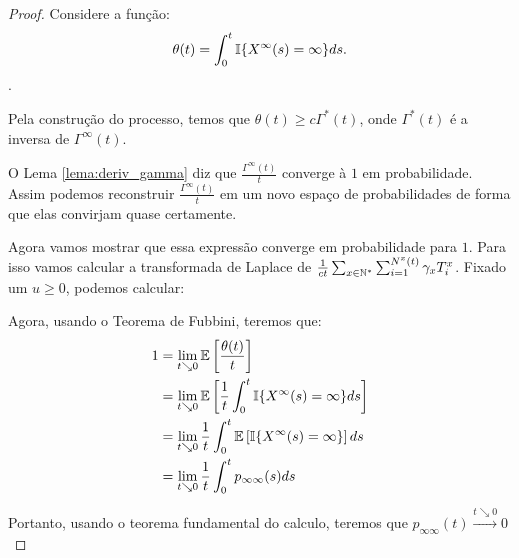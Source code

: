 \begin{proof}
  Considere a função:
  \begin{displaymath}
    \theta(t) = \int_0^t {\mathbb{I}} \{ X^\infty (s) = \infty \} ds.
  \end{displaymath}.
  
  Pela construção do processo, temos que $\theta(t) \geq c
  \Gamma^*(t)$, onde $\Gamma^*(t)$ é a inversa de $\Gamma^\infty(t)$.

  O Lema \ref{lema:deriv_gamma} diz que $\frac{\Gamma^\infty(t)}{t}$
  converge à $1$ em probabilidade. Assim podemos reconstruir
  $\frac{\Gamma^\infty(t)}{t}$ em um novo espaço de probabilidades de
  forma que elas convirjam quase certamente.

  Agora vamos mostrar que essa expressão converge em probabilidade
  para $1$. Para isso vamos calcular a transformada de Laplace de
  $\frac{1}{ct} \sum_{x \in {\mathbb{N^*}}} \sum_{i = 1}^{N^x(t)} \gamma_x
  T^x_i$. Fixado um $u \geq 0$, podemos calcular:






  Agora, usando o Teorema de Fubbini, teremos que:
  \begin{align*}
    1 &= \lim_{t \searrow 0} {\mathbb{E}} \left[ \frac{\theta(t)}{t} \right] \\ 
    &= \lim_{t \searrow 0} {\mathbb{E}}\left[
      \frac{1}{t} \int_0^t {\mathbb{I}}\{ X^\infty(s) = \infty \} ds
    \right] \\
    &= \lim_{t \searrow 0} 
      \frac{1}{t} \int_0^t {\mathbb{E}}\left[ {\mathbb{I}}\{ X^\infty(s) = \infty \}\right] ds
    \\
    &= \lim_{t \searrow 0} \frac{1}{t} \int_0^t p_{\infty \infty} (s) ds
  \end{align*}

  Portanto, usando o teorema fundamental do calculo, teremos que
  $p_{\infty \infty} (t) \xrightarrow{t \searrow 0} 0$


\end{proof}

